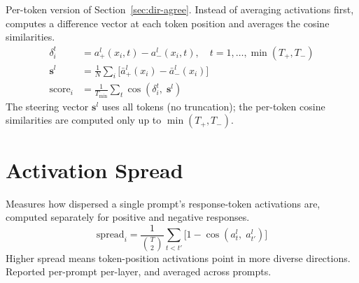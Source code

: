 \documentclass[11pt]{article}
\begin{document}
Per-token version of Section~\ref{sec:dir-agree}. Instead of averaging activations first, computes a difference vector at each token position and averages the cosine similarities.
\begin{align}
    \delta_i^t &= a^l_+(x_i, t) - a^l_-(x_i, t), \quad t = 1, \dots, \min(T_+, T_-) \\
    \mathbf{s}^l &= \frac{1}{N}\sum_i \bigl[\bar{a}^l_+(x_i) - \bar{a}^l_-(x_i)\bigr] \\
    \text{score}_i &= \frac{1}{T_{\min}} \sum_t \cos(\delta_i^t,\; \mathbf{s}^l)
\end{align}
The steering vector $\mathbf{s}^l$ uses all tokens (no truncation); the per-token cosine similarities are computed only up to $\min(T_+, T_-)$.

\section{Activation Spread}
\label{sec:spread}

Measures how dispersed a single prompt's response-token activations are, computed separately for positive and negative responses.
\begin{equation}
    \text{spread}_i = \frac{1}{\binom{T}{2}} \sum_{t < t'} \bigl[1 - \cos(a^l_t,\; a^l_{t'})\bigr]
\end{equation}
Higher spread means token-position activations point in more diverse directions. Reported per-prompt per-layer, and averaged across prompts.
\end{document}
